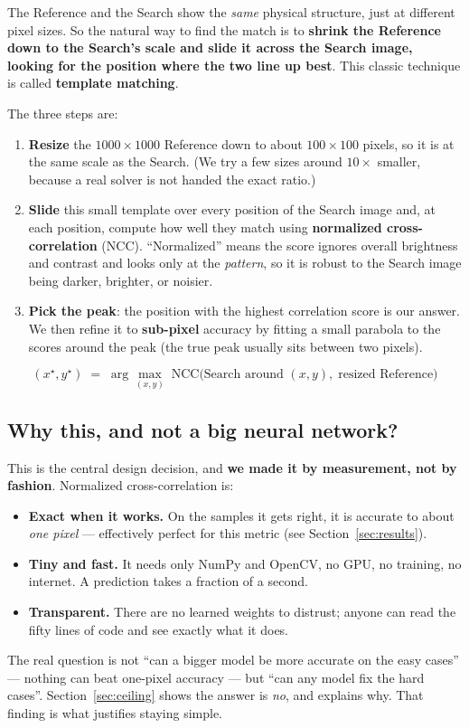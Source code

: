 \documentclass[11pt]{article}
\newcommand{\term}[1]{\textbf{\color{klablue}#1}}
\begin{document}
The Reference and the Search show the \emph{same} physical structure, just at
different pixel sizes. So the natural way to find the match is to \term{shrink
the Reference down to the Search's scale and slide it across the Search image,
looking for the position where the two line up best}. This classic technique
is called \term{template matching}.

The three steps are:

\begin{enumerate}[leftmargin=1.6em]
  \item \term{Resize} the $1000\times1000$ Reference down to about
        $100\times100$ pixels, so it is at the same scale as the Search.
        (We try a few sizes around $10\times$ smaller, because a real solver
        is not handed the exact ratio.)
  \item \term{Slide} this small template over every position of the Search
        image and, at each position, compute how well they match using
        \term{normalized cross-correlation} (NCC). ``Normalized'' means the
        score ignores overall brightness and contrast and looks only at the
        \emph{pattern}, so it is robust to the Search image being darker,
        brighter, or noisier.
  \item \term{Pick the peak}: the position with the highest correlation score
        is our answer. We then refine it to \term{sub-pixel} accuracy by
        fitting a small parabola to the scores around the peak (the true peak
        usually sits between two pixels).
\end{enumerate}

\[
  (x^\star,y^\star) \;=\; \arg\max_{(x,y)}\;
  \mathrm{NCC}\big(\text{Search around }(x,y),\;\text{resized Reference}\big)
\]

\subsection*{Why this, and not a big neural network?}
This is the central design decision, and \term{we made it by measurement, not
by fashion}. Normalized cross-correlation is:
\begin{itemize}[leftmargin=1.4em]
  \item \term{Exact when it works.} On the samples it gets right, it is
        accurate to about \emph{one pixel} --- effectively perfect for this
        metric (see Section~\ref{sec:results}).
  \item \term{Tiny and fast.} It needs only NumPy and OpenCV, no GPU, no
        training, no internet. A prediction takes a fraction of a second.
  \item \term{Transparent.} There are no learned weights to distrust; anyone
        can read the fifty lines of code and see exactly what it does.
\end{itemize}
The real question is not ``can a bigger model be more accurate on the easy
cases'' --- nothing can beat one-pixel accuracy --- but ``can any model fix
the hard cases''. Section~\ref{sec:ceiling} shows the answer is \emph{no}, and
explains why. That finding is what justifies staying simple.
\end{document}
